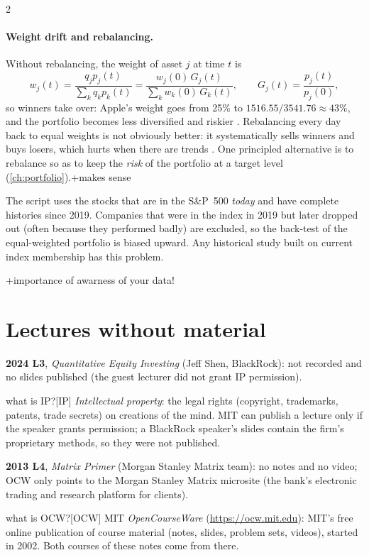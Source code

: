 \begin{paracol}{2}
\paragraph{Weight drift and rebalancing.} Without rebalancing, the weight of asset $j$ at time $t$ is
\[
  w_j(t) = \frac{q_jp_j(t)}{\sum_kq_kp_k(t)} = \frac{w_j(0)\,G_j(t)}{\sum_kw_k(0)\,G_k(t)},\qquad G_j(t)=\frac{p_j(t)}{p_j(0)},
\]
so winners take over: Apple's weight goes from 25\% to $1516.55/3541.76\approx43\%$, and the portfolio
becomes less diversified and riskier . Rebalancing every day back to equal weights is
not obviously better: it systematically sells winners and buys losers, which hurts when there are
trends . One principled alternative is to rebalance so as to keep the \emph{risk} of the
portfolio at a target level (\cref{ch:portfolio}).\note+{makes sense}

\begin{finance}
The script uses the stocks that are in the S\&P~500 \emph{today} and have complete histories since 2019.
Companies that were in the index in 2019 but later dropped out (often because they performed badly) are
excluded, so the back-test of the equal-weighted portfolio is biased upward. Any historical study built on
current index membership has this problem.
\end{finance}\note+{importance of awarness of your data!}

\section{Lectures without material}\label{sec:la-missing}
\begin{coursenote}[2024 L3 and 2013 L4]
\textbf{2024 L3}, \emph{Quantitative Equity Investing} (Jeff Shen, BlackRock): not recorded and no slides
published (the guest lecturer did not grant IP permission).\begin{answer}{what is IP?}[IP]
\emph{Intellectual property}: the legal rights (copyright, trademarks, patents, trade secrets) on
creations of the mind. MIT can publish a lecture only if the speaker grants permission; a BlackRock
speaker's slides contain the firm's proprietary methods, so they were not published.
\end{answer} \textbf{2013 L4}, \emph{Matrix Primer} (Morgan
Stanley Matrix team): no notes and no video; OCW only points to the Morgan Stanley Matrix microsite
(the bank's electronic trading and research platform for clients).\begin{answer}{what is OCW?}[OCW]
MIT \emph{OpenCourseWare} (\url{https://ocw.mit.edu}): MIT's free online publication of course
material (notes, slides, problem sets, videos), started in 2002. Both courses of these notes come from there.
\end{answer}
\end{coursenote}


\end{paracol}
